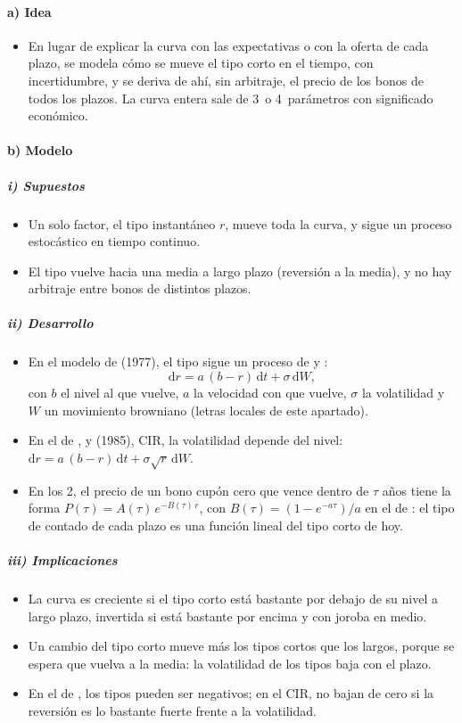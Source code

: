 \documentclass[11pt]{article}
\begin{document}
\paragraph{a) Idea}
\begin{itemize}
\item En lugar de explicar la curva con las expectativas o con la oferta de cada plazo, se modela cómo se mueve el tipo corto en el tiempo, con incertidumbre, y se deriva de ahí, sin arbitraje, el precio de los bonos de todos los plazos. La curva entera sale de 3~o 4~parámetros con significado económico.
\end{itemize}

\paragraph{b) Modelo}
\subparagraph{i) Supuestos}
\begin{itemize}
\item Un solo factor, el tipo instantáneo $r$, mueve toda la curva, y sigue un proceso estocástico en tiempo continuo.
\item El tipo vuelve hacia una media a largo plazo (reversión a la media), y no hay arbitraje entre bonos de distintos plazos.
\end{itemize}

\subparagraph{ii) Desarrollo}
\begin{itemize}
\item En el modelo de  (1977)\nocite{Vasicek1977Equilibrium}, el tipo sigue un proceso de  y :
  \[
  \mathrm{d}r=a\,(b-r)\,\mathrm{d}t+\sigma\,\mathrm{d}W ,
  \]
  con $b$ el nivel al que vuelve, $a$ la velocidad con que vuelve, $\sigma$ la volatilidad y $W$ un movimiento browniano (letras locales de este apartado).
\item En el de ,  y  (1985)\nocite{CoxIngersollRoss1985Theory}, CIR, la volatilidad depende del nivel: $\mathrm{d}r=a\,(b-r)\,\mathrm{d}t+\sigma\sqrt{r}\,\mathrm{d}W$.
\item En los 2, el precio de un bono cupón cero que vence dentro de $\tau$ años tiene la forma $P(\tau)=A(\tau)\,e^{-B(\tau)\,r}$, con $B(\tau)=(1-e^{-a\tau})/a$ en el de : el tipo de contado de cada plazo es una función lineal del tipo corto de hoy.
\end{itemize}

\subparagraph{iii) Implicaciones}
\begin{itemize}
\item La curva es creciente si el tipo corto está bastante por debajo de su nivel a largo plazo, invertida si está bastante por encima y con joroba en medio.
\item Un cambio del tipo corto mueve más los tipos cortos que los largos, porque se espera que vuelva a la media: la volatilidad de los tipos baja con el plazo.
\item En el de , los tipos pueden ser negativos; en el CIR, no bajan de cero si la reversión es lo bastante fuerte frente a la volatilidad.
\end{itemize}
\end{document}
